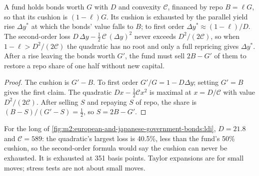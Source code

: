 \begin{proposition}\label{prop:m2:european-and-japanese-government-bonds:cushion}
A fund holds bonds worth $G$ with  $D$ and convexity $\mathcal C$,
financed by repo $B = \ell G$, so that its cushion is $(1-\ell)G$. Its cushion is
exhausted by the parallel yield rise $\Delta y^*$ at which the bonds' value falls
to $B$; to first order $\Delta y^* \approx (1-\ell)/D$. The second-order loss
$D\,\Delta y - \frac12\,\mathcal C\,(\Delta y)^2$ never exceeds $D^2/(2\mathcal C)$, so
when $1 - \ell > D^2/(2\mathcal C)$ the quadratic has no root and only a full
repricing gives $\Delta y^*$. After a rise leaving the bonds worth $G'$, the
fund must sell $2B - G'$ of them to restore a repo share of one half without
new capital.
\end{proposition}
\begin{proof}
The cushion is $G' - B$. To first order $G'/G = 1 - D\Delta y$; setting $G' = B$
gives the first claim. The quadratic $D x - \frac12 \mathcal C x^2$ is maximal at
$x = D/\mathcal C$ with value $D^2/(2\mathcal C)$. After selling $S$ and repaying
$S$ of repo, the share is $(B - S)/(G' - S) = \frac12$, so $S = 2B - G'$.
\end{proof}

For the long  of \cref{fig:m2:european-and-japanese-government-bonds:ldi},
$D = 21.8$ and $\mathcal C = 589$: the quadratic's largest loss is 40.5\%, less
than the fund's 50\% cushion, so the second-order formula would say the cushion
can never be exhausted. It is exhausted at 351 basis points. Taylor expansions
are for small moves; stress tests are not about small moves.


